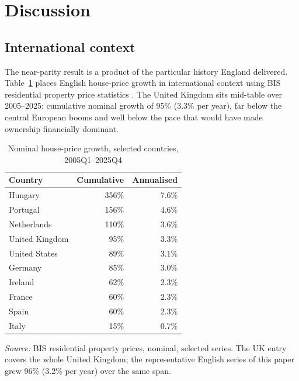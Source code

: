 
\section{Discussion}
\label{sec:discussion}

\subsection{International context}

The near-parity result is a product of the particular history England delivered. Table~\ref{tab:bis} places English house-price growth in international context using BIS residential property price statistics \parencite{bis_rpp}. The United Kingdom sits mid-table over 2005--2025: cumulative nominal growth of 95\% (3.3\% per year), far below the central European booms and well below the pace that would have made ownership financially dominant. 

\begin{table}[H]
  \centering
  \caption{Nominal house-price growth, selected countries, 2005Q1--2025Q4}
  \label{tab:bis}
  \begin{threeparttable}
  \begin{tabularx}{0.7\textwidth}{@{}Xrr@{}}
    \toprule
    \textbf{Country} & \textbf{Cumulative} & \textbf{Annualised} \\
    \midrule
    Hungary          & 356\% & 7.6\% \\
    Portugal         & 156\% & 4.6\% \\
    Netherlands      & 110\% & 3.6\% \\
    United Kingdom   & 95\%  & 3.3\% \\
    United States    & 89\%  & 3.1\% \\
    Germany          & 85\%  & 3.0\% \\
    Ireland          & 62\%  & 2.3\% \\
    France           & 60\%  & 2.3\% \\
    Spain            & 60\%  & 2.3\% \\
    Italy            & 15\%  & 0.7\% \\
    \bottomrule
  \end{tabularx}
  \begin{tablenotes}
    \small
    \item \textit{Source:} BIS residential property prices, nominal, selected series. The UK entry covers the whole United Kingdom; the representative English series of this paper grew 96\% (3.2\% per year) over the same span.
  \end{tablenotes}
  \end{threeparttable}
\end{table}

